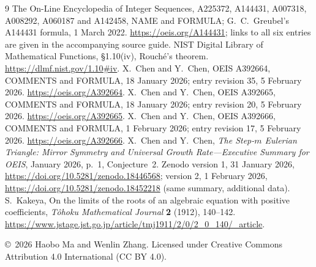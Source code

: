 \documentclass[11pt]{article}
\begin{document}
\clearpage
\begin{thebibliography}{9}
The On-Line Encyclopedia of Integer Sequences,
A225372, A144431, A007318, A008292, A060187 and A142458,
NAME and FORMULA; G.~C.~Greubel's A144431 formula,
1 March 2022.
\url{https://oeis.org/A144431}; links to all six entries
are given in the accompanying source guide.
NIST Digital Library of Mathematical Functions,
\S1.10(iv), Rouch\'e's theorem.
\url{https://dlmf.nist.gov/1.10#iv}.
X.~Chen and Y.~Chen, OEIS A392664, COMMENTS and FORMULA,
18 January 2026; entry revision 35, 5 February 2026.
\url{https://oeis.org/A392664}.
X.~Chen and Y.~Chen, OEIS A392665, COMMENTS and FORMULA,
18 January 2026; entry revision 20, 5 February 2026.
\url{https://oeis.org/A392665}.
X.~Chen and Y.~Chen, OEIS A392666, COMMENTS and FORMULA,
1 February 2026; entry revision 17, 5 February 2026.
\url{https://oeis.org/A392666}.
X.~Chen and Y.~Chen,
\emph{The Step-$m$ Eulerian Triangle: Mirror Symmetry and Universal
Growth Rate---Executive Summary for OEIS}, January 2026,
p.~1, Conjecture~2. Zenodo version 1, 31 January 2026,
\url{https://doi.org/10.5281/zenodo.18446568}; version 2,
1 February 2026, \url{https://doi.org/10.5281/zenodo.18452218}
(same summary, additional data).
S.~Kakeya, On the limits of the roots of an algebraic equation with
positive coefficients, \emph{T\^ohoku Mathematical Journal}
\textbf{2} (1912), 140--142.
\url{https://www.jstage.jst.go.jp/article/tmj1911/2/0/2_0_140/_article}.
\end{thebibliography}
\medskip\noindent\small
\copyright\ 2026 Haobo Ma and Wenlin Zhang.
Licensed under Creative Commons Attribution 4.0 International (CC BY 4.0).
\end{document}
